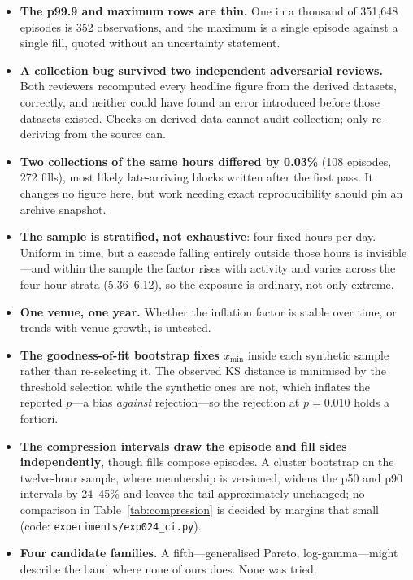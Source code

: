 \documentclass[11pt,a4paper]{article}
\begin{document}
\begin{itemize}
\item \textbf{The p99.9 and maximum rows are thin.} One in a thousand of 351{,}648 episodes
      is 352 observations, and the maximum is a single episode against a single fill, quoted
      without an uncertainty statement.
\item \textbf{A collection bug survived two independent adversarial reviews.} Both
      reviewers recomputed every headline figure from the derived datasets, correctly, and
      neither could have found an error introduced before those datasets existed. Checks on
      derived data cannot audit collection; only re-deriving from the source can.
\item \textbf{Two collections of the same hours differed by 0.03\%} (108 episodes, 272 fills),
      most likely late-arriving blocks written after the first pass. It changes no figure here,
      but work needing exact reproducibility should pin an archive snapshot.
\item \textbf{The sample is stratified, not exhaustive}: four fixed hours per day. Uniform in
      time, but a cascade falling entirely outside those hours is invisible---and within the
      sample the factor rises with activity and varies across the four hour-strata
      (5.36--6.12), so the exposure is ordinary, not only extreme.
\item \textbf{One venue, one year.} Whether the inflation factor is stable over time, or trends
      with venue growth, is untested.
\item \textbf{The goodness-of-fit bootstrap fixes $x_{\min}$} inside each synthetic sample
      rather than re-selecting it. The observed KS distance is minimised by the threshold
      selection while the synthetic ones are not, which inflates the reported $p$---a bias
      \emph{against} rejection---so the rejection at $p = 0.010$ holds a fortiori.
\item \textbf{The compression intervals draw the episode and fill sides independently}, though
      fills compose episodes. A cluster bootstrap on the twelve-hour sample, where membership
      is versioned, widens the p50 and p90 intervals by 24--45\% and leaves the tail
      approximately unchanged; no comparison in Table~\ref{tab:compression} is decided by
      margins that small (code: \texttt{experiments/exp024\_ci.py}).
\item \textbf{Four candidate families.} A fifth---generalised Pareto, log-gamma---might describe
      the band where none of ours does. None was tried.

\end{itemize}
\end{document}
